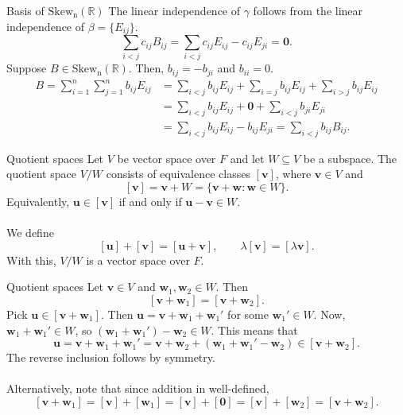 \documentclass{beamer}
\def\Skew{\operatorname{Skew_n(\mathbb{R})}}
\def\u{\bm{u}}
\def\v{\bm{v}}
\def\w{\bm{w}}
\begin{document}
        \begin{frame}{Basis of $\Skew$}
                The linear independence of $\gamma$ follows from the linear independence of $\beta = \{E_{ij}\}$.
                \[
                        \sum_{i < j} c_{ij}B_{ij} = \sum_{i < j} c_{ij} E_{ij} - c_{ij}E_{ji} = \mathbf{0}.
                \]
                \pause
                Suppose $B \in \Skew$. Then, $b_{ij} = -b_{ji}$ and $b_{ii} = 0$.
                \begin{align*}
                        B = \sum_{i = 1}^n \sum_{j = 1}^n b_{ij}E_{ij} 
                                &= \sum_{i < j} b_{ij}E_{ij} + \sum_{i = j}b_{ij}E_{ij} + \sum_{i > j} b_{ij}E_{ij} \\
                                &= \sum_{i < j} b_{ij}E_{ij} + \mathbf{0} + \sum_{i < j} b_{ji}E_{ji} \\
                                &= \sum_{i < j} b_{ij}E_{ij} - b_{ij}E_{ji} = \sum_{i < j} b_{ij}B_{ij}.
                \end{align*}
        \end{frame}

        \begin{frame}{Quotient spaces}
                Let $V$ be vector space over $F$ and let $W\subseteq V$ be a subspace.
                The quotient space $V/W$ consists of equivalence classes $[\v]$, where $\v \in V$ and
                \[
                        [\v] = \v + W = \{\v + \w\colon \w \in W\}.
                \]
                Equivalently, $\u \in [\v]$ if and only if $\u - \v \in W$. \\~\\
                \pause
                We define
                \[
                        [\u] + [\v] = [\u + \v], \qquad \lambda[\v] = [\lambda\v].
                \]
                With this, $V/W$ is a vector space over $F$.
        \end{frame}
        
        \begin{frame}{Quotient spaces}
                Let $\v \in V$ and $\w_1, \w_2 \in W$. Then
                \[
                        [\v + \w_1] = [\v + \w_2].
                \]
                Pick $\u \in [\v + \w_1]$. Then $\u = \v + \w_1 + \w_1'$ for some $\w_1' \in W$. Now, $\w_1 + \w_1' \in W$,
                so $(\w_1 + \w_1') - \w_2 \in W$. This means that
                \[
                        \u = \v + \w_1 + \w_1' = \v + \w_2 + (\w_1 + \w_1' - \w_2) \in [\v + \w_2].
                \]
                The reverse inclusion follows by symmetry. \\~\\
                \pause
                Alternatively, note that since addition in well-defined,
                \[
                        [\v + \w_1] = [\v] + [\w_1] = [\v] + [\mathbf{0}] = [\v] + [\w_2] = [\v + \w_2].
                \]
        \end{frame}
\end{document}
